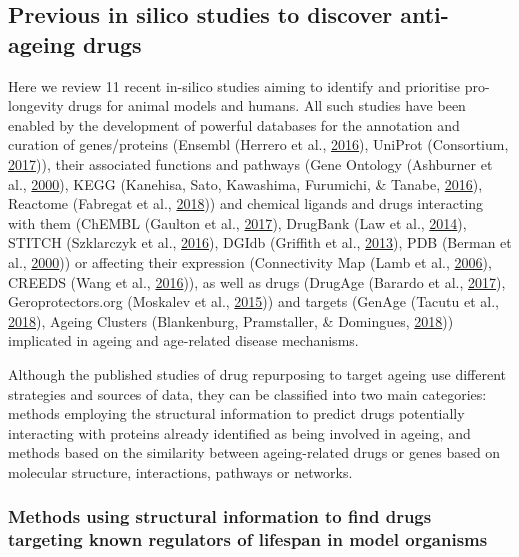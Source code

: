 \documentclass[12pt,twoside]{unicam}
\begin{document}
\hypertarget{prevDrugStudies}{%
\subsection{Previous in silico studies to discover anti-ageing drugs}\label{prevDrugStudies}}

Here we review 11 recent in-silico studies aiming to identify and prioritise pro-longevity drugs for animal models and humans. All such studies have been enabled by the development of powerful databases for the annotation and curation of genes/proteins (Ensembl (Herrero et al., \protect\hyperlink{ref-Herrero2016}{2016}), UniProt (Consortium, \protect\hyperlink{ref-Consortium2017}{2017})), their associated functions and pathways (Gene Ontology (Ashburner et al., \protect\hyperlink{ref-Ashburner2000}{2000}), KEGG (Kanehisa, Sato, Kawashima, Furumichi, \& Tanabe, \protect\hyperlink{ref-Kanehisa2016}{2016}), Reactome (Fabregat et al., \protect\hyperlink{ref-Fabregat2018}{2018})) and chemical ligands and drugs interacting with them (ChEMBL (Gaulton et al., \protect\hyperlink{ref-Gaulton2017}{2017}), DrugBank (Law et al., \protect\hyperlink{ref-Law2014}{2014}), STITCH (Szklarczyk et al., \protect\hyperlink{ref-Szklarczyk2016}{2016}), DGIdb (Griffith et al., \protect\hyperlink{ref-Griffith2013}{2013}), PDB (Berman et al., \protect\hyperlink{ref-Berman2000}{2000})) or affecting their expression (Connectivity Map (Lamb et al., \protect\hyperlink{ref-Lamb2006}{2006}), CREEDS (Wang et al., \protect\hyperlink{ref-Wang2016}{2016})), as well as drugs (DrugAge (Barardo et al., \protect\hyperlink{ref-Barardo2017}{2017}), Geroprotectors.org (Moskalev et al., \protect\hyperlink{ref-Moskalev2015}{2015})) and targets (GenAge (Tacutu et al., \protect\hyperlink{ref-Tacutu2018}{2018}), Ageing Clusters (Blankenburg, Pramstaller, \& Domingues, \protect\hyperlink{ref-Blankenburg2018}{2018})) implicated in ageing and age-related disease mechanisms.

Although the published studies of drug repurposing to target ageing use different strategies and sources of data, they can be classified into two main categories: methods employing the structural information to predict drugs potentially interacting with proteins already identified as being involved in ageing, and methods based on the similarity between ageing-related drugs or genes based on molecular structure, interactions, pathways or networks.

\hypertarget{drugStrMethods}{%
\subsubsection{Methods using structural information to find drugs targeting known regulators of lifespan in model organisms}\label{drugStrMethods}}
\end{document}
